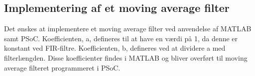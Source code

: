 \subsection{Implementering af et moving average filter}
Det ønskes at implementere et moving average filter ved anvendelse af MATLAB samt PSoC. Koefficienten, a, defineres til at have en værdi på 1, da denne er konstant ved FIR-filtre. Koefficienten, b, defineres ved at dividere a med filterlængden. Disse koefficienter findes i MATLAB og bliver overført til moving average filteret programmeret i PSoC. 
